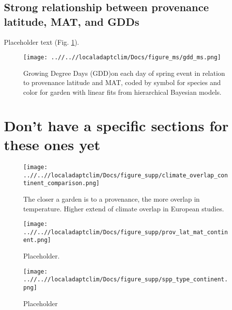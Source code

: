 \documentclass{article}
\begin{document}
\subsection* {Strong relationship between provenance latitude, MAT, and GDDs}

Placeholder text (Fig. \ref{figure:gdd}).

\begin{figure}[!h] 
    \centering
 \texttt{[image: ..//..//localadaptclim/Docs/figure\_ms/gdd\_ms.png]}
    \caption{Growing Degree Days (GDD)on each day of spring event in relation to provenance latitude and MAT, coded by symbol for species and color for garden with linear fits from hierarchical Bayesian models.}
    \label{figure:gdd}
\end{figure}


\section {Don't have a specific sections for these ones yet}

\begin{figure}[!h] 
    \centering
 \texttt{[image: ..//..//localadaptclim/Docs/figure\_supp/climate\_overlap\_continent\_comparison.png]}
    \caption{The closer a garden is to a provenance, the more overlap in temperature. 
Higher extend of climate overlap in European studies.}
    \label{figure:overlap_continent}
\end{figure}

\begin{figure}[!h] 
    \centering
 \texttt{[image: ..//..//localadaptclim/Docs/figure\_supp/prov\_lat\_mat\_continent.png]}
    \caption{Placeholder.}
    \label{figure:lat_mat_continent}
\end{figure}


\begin{figure}[!h] 
    \centering
 \texttt{[image: ..//..//localadaptclim/Docs/figure\_supp/spp\_type\_continent.png]}
    \caption{Placeholder}
    \label{figure:spp_continent}
\end{figure}
\end{document}
